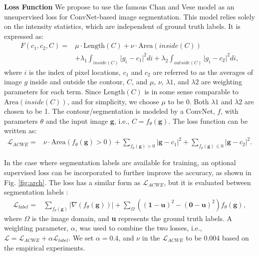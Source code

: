 \documentclass{midl}
\begin{document}
\noindent\textbf{Loss Function}
We propose to use the famous Chan and Vese model \cite{Chan2001} as an unsupervised loss for ConvNet-based image segmentation. This model relies solely on the intensity statistics, which are independent of ground truth labels. It is expressed as:
\begin{equation} \label{eqACWE}
\begin{split}
F(c_1,c_2,C)  = &\mu\cdot\text{Length}(C)+\nu\cdot\text{Area}(inside(C))\\
&+\lambda_1\int_{inside(C)}\vert g_i-c_1\vert^2di+\lambda_2\int_{outside(C)}\vert g_i-c_2\vert^2di,
\end{split}
\end{equation}
\noindent where $i$ is the index of pixel locations, $c_1$ and $c_2$ are referred to as the averages of image $g$ inside and outside the contour, $C$, and $\mu$, $\nu$, $\lambda1$, and $\lambda2$ are weighting parameters for each term. Since $\text{Length}(C)$ is in some sense comparable to $\text{Area}(inside(C))$\cite{Chan2001}, and for simplicity, we choose $\mu$ to be 0. Both $\lambda1$ and $\lambda2$ are chosen to be 1. The contour/segmentation is modeled by a ConvNet, $f$, with parameters $\theta$ and the input image $\textbf{g}$, i.e., $C = f_\theta(\textbf{g})$. The loss function can be written as:
\begin{equation} \label{eqACWE_loss}
\begin{split}
\mathcal{L}_{ACWE}  = &\nu\cdot\text{Area}(f_\theta(\textbf{g})>0)
+\sum_{f_\theta(\textbf{g})>0}\vert \textbf{g}-c_1\vert^2+\sum_{f_\theta(\textbf{g})\leq0}\vert \textbf{g}-c_2\vert^2.
\end{split}
\end{equation}

In the case where segmentation labels are available for training, an optional supervised loss can be incorporated to further improve the accuracy, as shown in Fig. \ref{fig:arch}. The loss has a similar form as $\mathcal{L}_{ACWE}$, but it is evaluated between segmentation labels \cite{ChenACWE2019}:
\begin{equation} \label{eqACWE_label_loss}
\begin{split}
\mathcal{L}_{label}  = &\sum_{f_\theta(\textbf{g})}\vert\nabla(f_\theta(\textbf{g}))\vert
+\sum_{\Omega}((\textbf{1}-\textbf{u})^2-(\textbf{0}-\textbf{u})^2)f_\theta(\textbf{g}),
\end{split}
\end{equation}
\noindent where $\Omega$ is the image domain, and \textbf{u} represents the ground truth labels. A weighting parameter, $\alpha$, was used to combine the two losses, i.e., $\mathcal{L}=\mathcal{L}_{ACWE}+\alpha\mathcal{L}_{label}$. We set $\alpha = 0.4$, and $\nu$ in the $\mathcal{L}_{ACWE}$ to be $0.004$ based on the empirical experiments.
\end{document}
